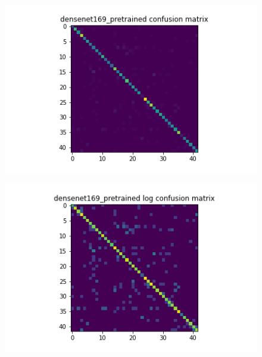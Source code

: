 \begin{figure}[t]
  \begin{minipage}[b]{.5\linewidth}
    \centering
    {\includegraphics[width=1.2\textwidth]{figs/conf_matrix/densenet169_pretrained_conf.png}}
  \end{minipage}
  \hfill
  \begin{minipage}[b]{.5\linewidth}
    \centering

    {\includegraphics[width=1.2\textwidth]{figs/conf_matrix/densenet169_pretrained_log_conf.png}}
  \end{minipage}
  \vfill
  \begin{minipage}[b]{.5\linewidth}
    \centering


\end{minipage}
\end{figure}
